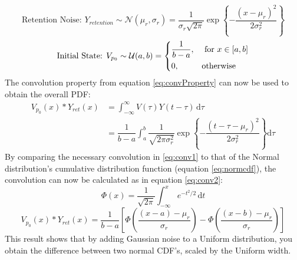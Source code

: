 \documentclass[11pt]{article}
\numberwithin{equation}{subsection}
\begin{document}
\begin{equation}
\text{Retention Noise: } Y_{retention} \sim \mathcal{N}(\mu_r,\sigma_r) = \dfrac{1}{\sigma_r\sqrt{2\pi}} \exp\left\{{-\dfrac{(x-\mu_r)^2}{2\sigma_r^2}}\right\}
\end{equation}
\begin{equation}
\text{Initial State: } V_{p_0} \sim \mathcal{U}(a,b) = \begin{dcases}
    \dfrac{1}{b-a},& \text{ for } x \in [a,b]\\
    0,              & \text{otherwise}
\end{dcases}
\end{equation}
The convolution property from equation \ref{eq:convProperty} can now be used to obtain the overall PDF:
\begin{equation} \label{eq:conv1}
\begin{aligned}
V_{p_0}(x) \ast Y_{ret}(x) &= \int_{-\infty}^{\infty} V(\tau)Y(t-\tau)\,\mathrm{d}\tau \\
&= \dfrac{1}{b-a} \int_{a}^{b} \dfrac{1}{\sqrt{2\pi\sigma_r^2}} \exp\left\{{-\dfrac{(t-\tau-\mu_r)^2}{2\sigma_r^2}}\right\}\mathrm{d}\tau
\end{aligned}
\end{equation}
By comparing the necessary convolution in \ref{eq:conv1} to that of the Normal distribution's cumulative distribution function (equation \ref{eq:normcdf}), the convolution can now be calculated as in equation \ref{eq:conv2}:
\begin{equation} \label{eq:normcdf}
\Phi(x) = \dfrac{1}{\sqrt{2\pi}} \int_{-\infty}^x e^{-t^2/2} \, \mathrm{d}t
\end{equation}
\begin{equation} \label{eq:conv2}
V_{p_0}(x) \ast Y_{ret}(x) = \dfrac{1}{b-a}\left[ \Phi\left(\dfrac{(x-a)-\mu_r}{\sigma_r}\right) - \Phi\left(\dfrac{(x-b)-\mu_r}{\sigma_r}\right)\right]
\end{equation}
This result shows that by adding Gaussian noise to a Uniform distribution, you obtain the difference between two normal CDF's, scaled by the Uniform width.
\end{document}
